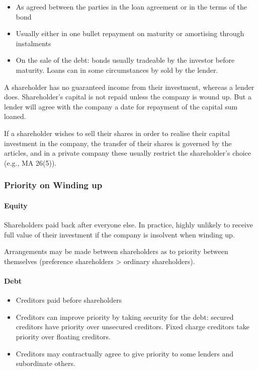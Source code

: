 \documentclass[
]{article}
\providecommand{\tightlist}{%
  \setlength{\itemsep}{0pt}\setlength{\parskip}{0pt}}
\begin{document}
\begin{itemize}
\tightlist
\item
  As agreed between the parties in the loan agreement or in the terms of
  the bond
\item
  Usually either in one bullet repayment on maturity or amortising
  through instalments
\item
  On the sale of the debt: bonds usually tradeable by the investor
  before maturity. Loans can in some circumstances by sold by the
  lender.
\end{itemize}

A shareholder has no guaranteed income from their investment, whereas a
lender does. Shareholder's capital is not repaid unless the company is
wound up. But a lender will agree with the company a date for repayment
of the capital sum loaned.

If a shareholder wishes to sell their shares in order to realise their
capital investment in the company, the transfer of their shares is
governed by the articles, and in a private company these usually
restrict the shareholder's choice (e.g., MA 26(5)).

\hypertarget{priority-on-winding-up}{%
\subsubsection{Priority on Winding up}\label{priority-on-winding-up}}

\hypertarget{equity-2}{%
\paragraph{Equity}\label{equity-2}}

Shareholders paid back after everyone else. In practice, highly unlikely
to receive full value of their investment if the company is insolvent
when winding up.

Arrangements may be made between shareholders as to priority between
themselves (preference shareholders \textgreater{} ordinary
shareholders).

\hypertarget{debt-2}{%
\paragraph{Debt}\label{debt-2}}

\begin{itemize}
\tightlist
\item
  Creditors paid before shareholders
\item
  Creditors can improve priority by taking security for the debt:
  secured creditors have priority over unsecured creditors. Fixed charge
  creditors take priority over floating creditors.
\item
  Creditors may contractually agree to give priority to some lenders and
  subordinate others.
\end{itemize}
\end{document}
